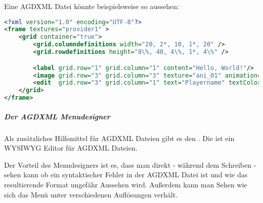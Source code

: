 Eine  AGDXML Datei könnte beispielsweise so aussehen:

\begin{lstlisting}[caption=Eine Beispiel AGDXML Menü Definition, title=\hspace{0 pt}, language=xml]
<?xml version="1.0" encoding="UTF-8"?>
<frame textures="provider1" >
	<grid container="true">
		<grid.columndefinitions width="20, 2*, 10, 1*, 20" />
		<grid.rowdefinitions height="8\%, 40, 4\%, 1*, 4\%" />

		<label grid.row="1" grid.column="1" content="Hello, World!"/>
		<image grid.row="3" grid.column="3" texture="ani_01" animation="750" id="myImage"/>
		<edit  grid.row="3" grid.column="1" text="Playername" textColor="BLACK" halign="LEFT" />
	</grid>
</frame>
\end{lstlisting}

\subparagraph{Der AGDXML Menudesigner}

Als zusätzliches Hilfsmittel für AGDXML Dateien gibt es den . Die ist ein WYSIWYG Editor für AGDXML Dateien.

\dospace
{}

Der Vorteil des Menudesigners ist es, dass man direkt - während dem Schreiben - sehen kann ob ein syntaktischer Fehler in der AGDXML Datei ist und wie das resultierende Format ungefähr Aussehen wird. Außerdem kann man Sehen wie sich das Menü unter verschiedenen Auflösungen verhält.
